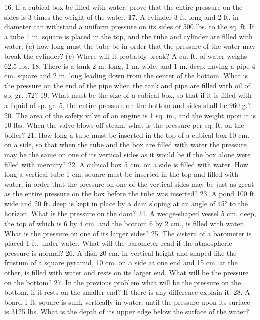 16. If a cubical box be filled with water, prove that the entire pressure on the sides is 3 times the weight of the water.
17. A cylinder 3 ft. long and 2 ft. in diameter can withstand a uniform pressure on its sides of 500 lbs. to the sq. ft. If a tube 1 in. square is placed in the top, and the tube and cylinder are filled with water, (\emph{a}) how long must the tube be in order that the pressure of the water may break the cylinder? (\emph{b}) Where will it probably break? A cu. ft. of water weighs 62.5 lbs.
18. There is a tank 2 m. long, 1 m. wide, and 1 m. deep, having a pipe 4 cm. square and 2 m. long leading down from the center of the bottom. What is the pressure on the end of the pipe when the tank and pipe are filled with oil of sp. gr. .72?
19. What must be the size of a cubical box, so that if it is filled with a liquid of sp. gr. 5, the entire pressure on the bottom and sides shall be 960 g.?
20. The area of the safety valve of an engine is 1 sq. in., and the weight upon it is 10 lbs. When the valve blows off steam, what is the pressure per sq. ft. on the boiler?
21. How long a tube must be inserted in the top of a cubical box 10 cm. on a side, so that when the tube and the box are filled with water the pressure may be the same on one of its vertical sides as it would be if the box alone were filled with mercury?
22. A cubical box 5 cm. on a side is filled with water. How long a vertical tube 1 cm. square must be inserted in the top and filled with water, in order that the pressure on one of the vertical sides may be just as great as the entire pressure on the box before the tube was inserted?
23. A pond 100 ft. wide and 20 ft. deep is kept in place by a dam sloping at an angle of 45° to the horizon. What is the pressure on the dam?
24. A wedge-shaped vessel 5 cm. deep, the top of which is 6 by 4 cm. and the bottom 6 by 2 cm., is filled with water. What is the pressure on one of its larger sides?
25. The cistern of a barometer is placed 1 ft. under water. What will the barometer read if the atmospheric pressure is normal?
26. A dish 20 cm. in vertical height and shaped like the frustum of a square pyramid, 10 cm. on a side at one end and 15 cm. at the other, is filled with water and rests on its larger end. What will be the pressure on the bottom?
27. In the previous problem what will be the pressure on the bottom, if it rests on the smaller end? If there is any difference explain it.
28. A board 1 ft. square is sunk vertically in water, until the pressure upon its surface is 3125 lbs. What is the depth of its upper edge below the surface of the water?
